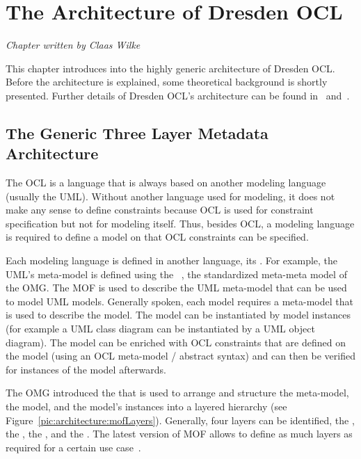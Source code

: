 \chapter{The Architecture of Dresden OCL}
\label{chapter:architecture}

\begin{flushright}
\textit{Chapter written by Claas Wilke}
\end{flushright}

This chapter introduces into the highly generic architecture of Dresden OCL.
Before the architecture is explained, some theoretical background is shortly 
presented. Further details of Dresden OCL's architecture can be found
in~\cite{braeuerEA:OCL2007} and~\cite{wilkeEA:MODELS2010}.



\section{The Generic Three Layer Metadata Architecture}
\label{architecture:genericLayers}

The \acl{OCL} is a language that is always based on another modeling language 
(usually the \acs{UML}). Without another language used for modeling, it does 
not make any sense to define constraints because \acs{OCL} is used for
constraint specification but not for modeling itself. Thus, besides \acs{OCL}, 
a modeling language is required to define a model on that \acs{OCL} constraints 
can be specified.

Each modeling language is defined in another language, its 
. For example, the \acl{UML}'s meta-model is 
defined using the ~\cite{spec:MOF2.0}, the standardized
meta-meta model of the \acs{OMG}. The \acs{MOF} is used to describe the 
\acs{UML} meta-model that can be used to model \acs{UML} models. Generally 
spoken, each model requires a meta-model that is used to describe the model. 
The model can be instantiated by model instances (for example a \acs{UML} class 
diagram can be instantiated by a \acs{UML} object diagram). The model can be 
enriched with \acs{OCL} constraints that are defined on the model (using an 
\acs{OCL} meta-model / abstract syntax) and can then be verified for instances
of the model afterwards.

The \acs{OMG} introduced the  \cite{spec:MOF2.0}\cite[p. 16ff]{spec:UML2-2Inf} that is used to 
arrange and structure the meta-model, the model, and the model's instances into 
a layered hierarchy (see Figure~\ref{pic:architecture:mofLayers}). Generally, 
four layers can be identified, the , the
, the , and the 
. The latest version of \acs{MOF} allows to
define as much layers as required for a certain use
case~\cite[p.~8f]{spec:MOF2.0}. 

